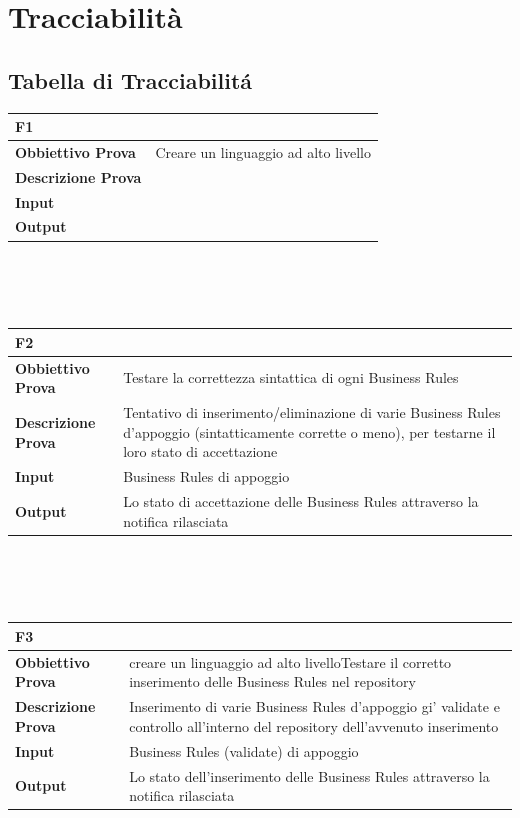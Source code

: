 \documentclass[11pt,titlepage,a4paper]{report}
\begin{document}
\chapter{Tracciabilit\`a}
\section{Tabella di Tracciabilit\'a}
\begin{tabular}{||p{4.5cm}||p{7.5cm}||}
\hline
\textbf{\textsf{F1}} \\
\hline
{\textbf {Obbiettivo Prova}}& Creare un linguaggio ad alto livello \\ \hline
{\textbf{Descrizione Prova}}&  \\ \hline
{\textbf{Input}}&  \\ \hline
{\textbf{Output}}& \\ \hline
\end{tabular} \\
\\
\\
\begin{tabular}{||p{4.5cm}||p{7.5cm}||}
\hline
\textbf{\textsf{F2}} \\
\hline
{\textbf {Obbiettivo Prova}}& Testare la correttezza sintattica di ogni Business Rules \\ \hline
{\textbf{Descrizione Prova}}& Tentativo di inserimento/eliminazione di varie Business Rules d'appoggio (sintatticamente corrette o meno), per testarne il loro stato di accettazione \\ \hline
{\textbf{Input}}& Business Rules di appoggio \\ \hline
{\textbf{Output}}& Lo stato di accettazione delle Business Rules attraverso la notifica rilasciata \\ \hline
\end{tabular} \\
\\
\\
\begin{tabular}{||p{4.5cm}||p{7.5cm}||}
\hline
\textbf{\textsf{F3}} \\
\hline
{\textbf {Obbiettivo Prova}}& creare un linguaggio ad alto livelloTestare il corretto inserimento delle Business Rules nel repository\\ \hline
{\textbf{Descrizione Prova}}&  Inserimento di varie Business Rules d'appoggio gi\a' validate e controllo all'interno del repository dell'avvenuto inserimento\\ \hline
{\textbf{Input}}& Business Rules (validate) di appoggio \\ \hline
{\textbf{Output}}& Lo stato dell'inserimento delle Business Rules attraverso la notifica rilasciata \\ \hline
\end{tabular} \\
\end{document}
